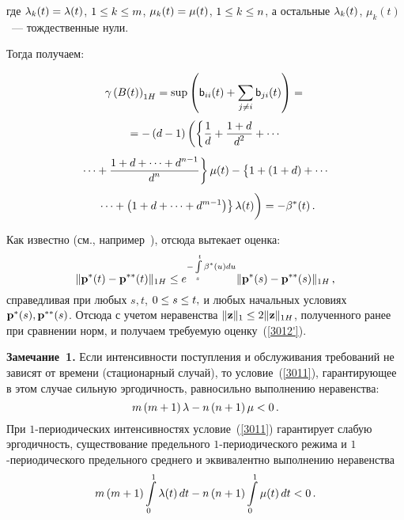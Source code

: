 \begin{multicols}{2}
\noindent
где $\lambda_k(t)=\lambda(t)$, $1 \hm\le k \hm\le m$,  $\mu_k(t)\hm=\mu(t)$, $1 \hm\le k \hm\le n$, 
а остальные $\lambda_k(t)$, $\mu_k(t)$~--- тождественные нули.

\columnbreak

Тогда получаем:

\noindent
\begin{multline*}
\gamma \left(B(t)\right)_{1H} = \sup \left(\textsf{b}_{ii}(t)  + 
\sum\limits_{j \neq i}\textsf{b}_{ji}(t)\right) = {}  \\[3pt]
{}= -\left( d-1\right)\left(\left\{\fr{1}{d} + \fr{1+d}{d^2} + \cdots{}\right.\right.\\[4pt]
\left.{}\cdots +
\fr{1+d+\cdots+d^{n-1}}{d^n}\right\}\mu(t) - 
 \left\{ \vphantom{d^{m-1}}
 1 + \left(1+d\right)+\cdots{}\right.\\[4pt]
\left.\left. {}\cdots+\left(1+d+\cdots+d^{m-1}\right)\right\}\la(t) 
\vphantom{\fr{1}{d}}\right) = -\beta^*(t)\,.  %
\end{multline*}

Как известно (см., например~\cite{z12}), отсюда вытекает оценка:
\begin{equation*}
\|{\mathbf p}^*(t)-{\mathbf p}^{**}(t)\|_{1H} \le e^{-\int\limits_s^t {\beta^*(u)du}}\|{\mathbf p}^*(s)-{\mathbf p}^{**}(s)\|_{1H}\,,
 \end{equation*}
справедливая при любых $s,t$, $0\hm\le s\hm\le t,$ и любых начальных условиях 
${\bf p^*}(s), {\bf p^{**}}(s)$. Отсюда с учетом неравенства 
$\|{\bf z}\|_{1} \hm\le 2\|{\bf z}\|_{1H}$, полученного ранее при сравнении норм, и 
получаем требуемую оценку~(\ref{3012'}).

\medskip


\noindent
\textbf{Замечание~1.}
Если интенсивности поступления и обслуживания требований не зависят от времени 
(стационарный случай), то условие~(\ref{3011}), гарантирующее в этом случае 
сильную эргодичность, равносильно выполнению неравенства:
\begin{equation*}
 m\left(m+1\right)\lambda - n\left(n+1\right)\mu < 0\,.
\end{equation*}
При $1$-периодических интенсивностях условие~(\ref{3011}) гарантирует 
слабую эргодичность,  существование предельного $1$-пе\-рио\-ди\-че\-ско\-го 
режима и $1$-пе\-рио\-ди\-че\-ско\-го предельного среднего и эквивалентно 
выполнению неравенства
\begin{equation*}
 m\left(m+1\right)\int\limits_0^1\lambda(t) \, dt  - n\left(n+1\right)\int\limits_0^1\mu(t) \, dt < 0\,.
\end{equation*}


\end{multicols}

